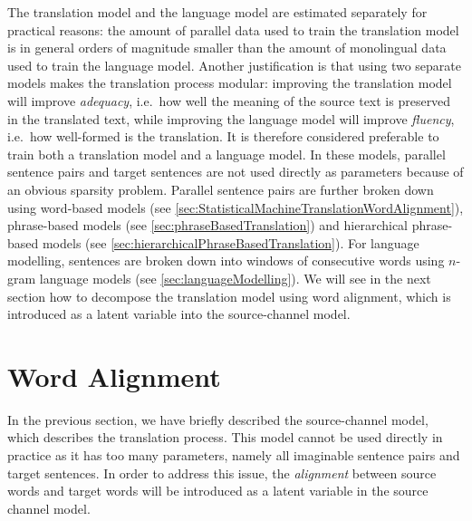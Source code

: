 The translation model and the language model are estimated separately
for practical reasons: the amount of parallel data used to train the translation
model is in general orders of magnitude smaller than the amount of monolingual
data used to train the language model. Another justification is that
using two separate models makes the translation process modular: improving
the translation model will improve \emph{adequacy}, i.e.\ how well the meaning
of the source text is preserved in the translated text, while improving
the language model will improve \emph{fluency}, i.e.\ how well-formed is the
translation. It is therefore considered
preferable to train both a translation model and a language model.
In these models, parallel sentence pairs and target sentences are
not used directly as parameters because of an obvious sparsity
problem. Parallel sentence pairs are further broken down using
word-based models (see \autoref{sec:StatisticalMachineTranslationWordAlignment}),
phrase-based models (see \autoref{sec:phraseBasedTranslation})
and hierarchical phrase-based models
(see \autoref{sec:hierarchicalPhraseBasedTranslation}). For language
modelling, sentences are broken down into windows of consecutive
words using $n$-gram language models (see \autoref{sec:languageModelling}).
We will see in the next section how to decompose
the translation model using word alignment, which is
introduced as a latent variable into the source-channel model.

\section{Word Alignment}
\label{sec:StatisticalMachineTranslationWordAlignment}

In the previous section, we have briefly described the source-channel model, which
describes the translation process. This model cannot be used directly in
practice as it has too many parameters, namely all imaginable
sentence pairs and target sentences. In order to address this issue,
the \emph{alignment} between source words and target words will be
introduced as a latent variable in the source channel model.

